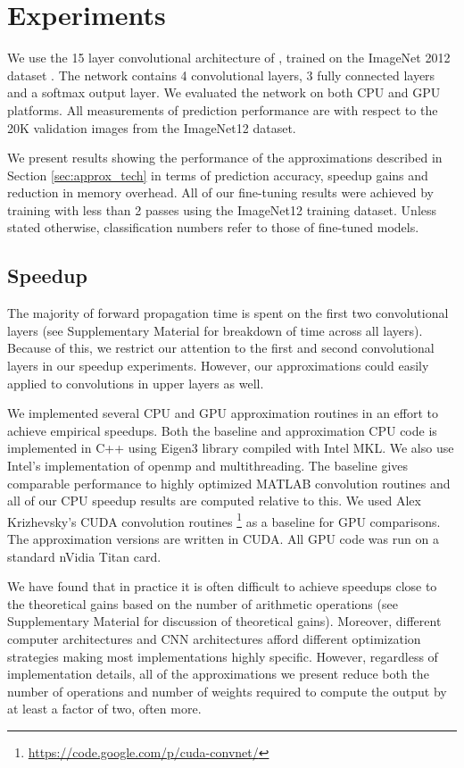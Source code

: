 \section{Experiments}\label{sec:experiments}

We use the 15 layer convolutional architecture of \cite{zeiler2013visualizing}, trained on the
ImageNet 2012 dataset \cite{imagenet}.
The network contains 4 convolutional layers, 3 fully connected layers and a softmax output layer.
We evaluated the network on both CPU and GPU platforms. All measurements of prediction performance are with respect to the 20K validation images from the ImageNet12 dataset. 

We present results showing the performance of the approximations described in Section \ref{sec:approx_tech} in terms of prediction accuracy, speedup gains and reduction in memory overhead. 
All of our fine-tuning results were achieved by training with less than 2 passes using the ImageNet12 training dataset. 
Unless stated otherwise, classification numbers refer to those of fine-tuned models.
 
\subsection{Speedup}
The majority of forward propagation time is spent on the first two convolutional layers (see Supplementary Material for breakdown of time across all layers).
Because of this, we restrict our attention to the first and second convolutional layers in our speedup experiments. 
However, our approximations could easily
applied to convolutions in upper layers as well.

We implemented several CPU and GPU approximation routines 
in an effort to achieve empirical
speedups. Both the baseline and approximation CPU code is implemented
in C++ using Eigen3 library \cite{eigenweb} compiled with Intel MKL.
We also use Intel's implementation of openmp and multithreading. The
baseline gives comparable performance to highly optimized MATLAB
convolution routines and all of our CPU speedup results are computed
relative to this.  We used Alex Krizhevsky's CUDA convolution routines
\footnote{\url{https://code.google.com/p/cuda-convnet/}} as a baseline for GPU
comparisons. The approximation versions are written in CUDA. All GPU
code was run on a standard nVidia Titan card.

We have found that in practice it is often difficult to achieve
speedups close to the theoretical gains based on the number of
arithmetic operations (see Supplementary Material for discussion of theoretical gains).
Moreover, different computer architectures and CNN 
architectures afford different optimization strategies making most
implementations highly specific.  However, regardless of
implementation details, all of the approximations we present reduce
both the number of operations and number of weights required to
compute the output by at least a factor of two, often more.  

